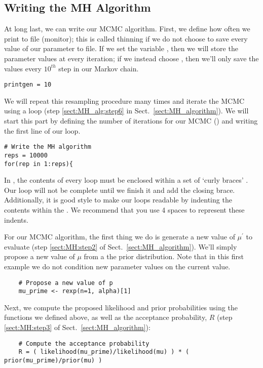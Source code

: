 \subsection{Writing the MH Algorithm}
At long last, we can write our MCMC algorithm.
First, we define how often we print to file (\IE monitor); this is called thinning if we do not choose to save every value of our parameter to file.
If we set the variable , then we will store the parameter values at every iteration; if we instead choose , then we'll only save the values every $10^{th}$ step in our Markov chain.
{\tt \begin{snugshade*}
\begin{lstlisting}    
printgen = 10
\end{lstlisting}
\end{snugshade*}}
We will repeat this resampling procedure many times and iterate the MCMC using a  loop (\EG step \ref{sect:MH_alg:step6} in Sect.\ \ref{sect:MH_algorithm}). 
We will start this part by defining the number of iterations for our MCMC () and writing the first line of our  loop. 
{\tt \begin{snugshade*}
\begin{lstlisting}    
# Write the MH algorithm
reps = 10000 
for(rep in 1:reps){
\end{lstlisting}
\end{snugshade*}}
In \Rev, the contents of every  loop must be enclosed within a set of  `curly braces' . Our loop will not be complete until we finish it and add the closing brace. 
Additionally, it is good style to make our loops readable by indenting the contents within the . 
We recommend that you use 4 spaces to represent these indents.

For our MCMC algorithm, the first thing we do is generate a new value of $\mu^\prime$ to evaluate (step \ref{sect:MH:step2} of Sect.\ \ref{sect:MH_algorithm}).
We'll simply propose a new value of $\mu$ from a the prior distribution.
Note that in this first example we do not condition new parameter values on the current value.
{\tt \begin{snugshade*}
\begin{lstlisting}    
    # Propose a new value of p
    mu_prime <- rexp(n=1, alpha)[1]
\end{lstlisting}
\end{snugshade*}}

Next, we compute the proposed likelihood and prior probabilities using the functions we defined above, as well as the acceptance probability, $R$ (step \ref{sect:MH:step3} of Sect.\ \ref{sect:MH_algorithm}):
{\tt \begin{snugshade*}
\begin{lstlisting}    
    # Compute the acceptance probability
    R = ( likelihood(mu_prime)/likelihood(mu) ) * ( prior(mu_prime)/prior(mu) )
\end{lstlisting}
\end{snugshade*}}


